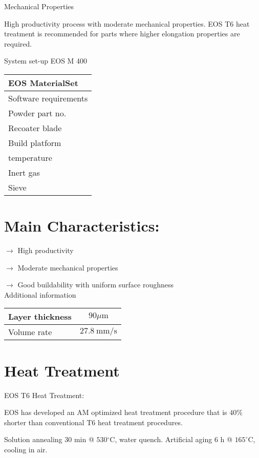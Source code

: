 \documentclass[10pt]{article}
\begin{document}
Mechanical Properties

High productivity process with moderate mechanical properties. EOS T6 heat treatment is recommended for parts where higher elongation properties are required.

System set-up EOS M 400

\begin{center}
\begin{tabular}{l}
\hline
EOS MaterialSet \\
\hline
Software requirements \\
\hline
Powder part no. \\
\hline
Recoater blade \\
\hline
Build platform \\
temperature \\
Inert gas \\
\hline
Sieve \\
\hline
\end{tabular}
\end{center}

\section*{Main Characteristics:}
$\longrightarrow$ High productivity

$\longrightarrow$ Moderate mechanical properties

$\longrightarrow$ Good buildability with uniform surface roughness\\
Additional information

\begin{center}
\begin{tabular}{lc}
\hline
Layer thickness & $90 \mu \mathrm{m}$ \\
\hline
Volume rate & $27.8 \mathrm{~mm} / \mathrm{s}$ \\
\hline
\end{tabular}
\end{center}

\section*{Heat Treatment}
EOS T6 Heat Treatment:

EOS has developed an AM optimized heat treatment procedure that is $40 \%$ shorter than conventional T6 heat treatment procedures.

Solution annealing 30 min @ $530{ }^{\circ} \mathrm{C}$, water quench. Artificial aging 6 h @ $165^{\circ} \mathrm{C}$, cooling in air.
\end{document}
